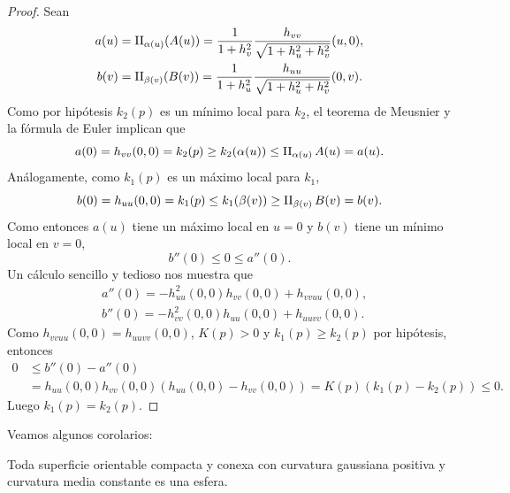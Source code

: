 \begin{proof}
	Sean
	\begin{align*}
		a(u) &= \operatorname{II}_{\alpha(u)}(A(u))=\frac{1}{1+h_v^2}\frac{h_{vv}}{\sqrt{1+h_u^2+h_v^2}}(u,0),\\
		b(v) &= \operatorname{II}_{\beta(v)}(B(v))=\frac{1}{1+h_u^2}\frac{h_{uu}}{\sqrt{1+h_u^2+h_v^2}}(0,v).
	\end{align*}
	Como por hipótesis $k_2(p)$ es un mínimo local para $k_2$, el teorema de
	Meusnier y la fórmula de Euler implican que  
	\[
		a(0)=h_{vv}(0,0)=k_2(p)\geq k_2(\alpha(u))\leq\operatorname{II}_{\alpha(u)}A(u)=a(u).
	\]
	Análogamente, como $k_1(p)$ es un máximo local para $k_1$, 
	\[
		b(0)=h_{uu}(0,0)=k_1(p)\leq k_1(\beta(v))\geq\operatorname{II}_{\beta(v)}B(v)=b(v).
	\]
	Como entonces $a(u)$ tiene un máximo local en $u=0$ y $b(v)$ tiene un
	mínimo local en $v=0$, 
	\[
		b''(0)\leq 0 \leq a''(0).
	\]
	Un cálculo sencillo y tedioso nos muestra que
	\begin{align*}
		&a''(0)=-h_{uu}^2(0,0)h_{vv}(0,0)+h_{vvuu}(0,0),\\
		&b''(0)=-h_{vv}^2(0,0)h_{uu}(0,0)+h_{uuvv}(0,0).
	\end{align*}
	Como $h_{vvuu}(0,0)=h_{uuvv}(0,0)$, $K(p)>0$ y $k_1(p)\geq k_2(p)$ por
	hipótesis, entonces 
	\begin{align*}
		0 & \leq b''(0)-a''(0)\\
		&= h_{uu}(0,0)h_{vv}(0,0)(h_{uu}(0,0)-h_{vv}(0,0))
		= K(p)(k_1(p)-k_2(p))\leq 0.
	\end{align*}
	Luego $k_1(p)=k_2(p)$.
\end{proof}


Veamos algunos corolarios:

\begin{theorem}
	Toda superficie orientable compacta y conexa con curvatura gaussiana positiva 
	y curvatura media constante es una esfera.
\end{theorem}

